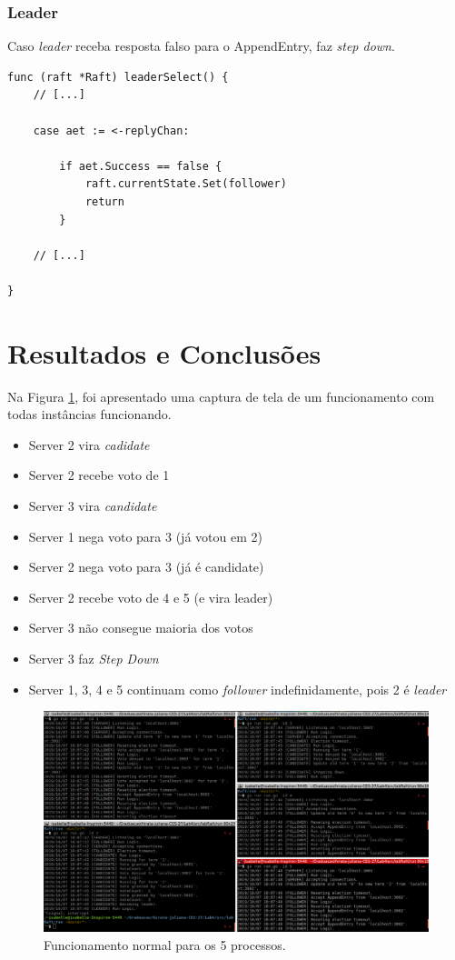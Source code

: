 \documentclass[journal,onecolumn]{IEEEtran}
\begin{document}
\subsubsection{Leader} Caso \textit{leader} receba resposta falso para o AppendEntry, faz \textit{step down}.

\begin{lstlisting}
func (raft *Raft) leaderSelect() {
	// [...]

	case aet := <-replyChan:

		if aet.Success == false {
			raft.currentState.Set(follower)
			return
		}

	// [...]

}
\end{lstlisting}


\section{Resultados e Conclusões}

Na Figura \ref{funcionamento_normal}, foi apresentado uma captura de tela de um funcionamento com todas instâncias funcionando.

\begin{itemize}
\item Server 2 vira \textit{cadidate}
\item Server 2 recebe voto de 1
\item Server 3 vira \textit{candidate}
\item Server 1 nega voto para 3 (já votou em 2)
\item Server 2 nega voto para 3 (já é candidate)
\item Server 2 recebe voto de 4 e 5 (e vira leader)
\item Server 3 não consegue maioria dos votos
\item Server 3 faz \textit{Step Down}
\item Server 1, 3, 4 e 5 continuam como \textit{follower} indefinidamente, pois 2 é \textit{leader}

\end{itemize}

\begin{figure}[H]
\centering
\centerline{\includegraphics[scale=0.4]{imagens/funcionamento_normal.png}}
\caption{Funcionamento normal para os 5 processos.}
\label{funcionamento_normal}
\end{figure}
\end{document}
